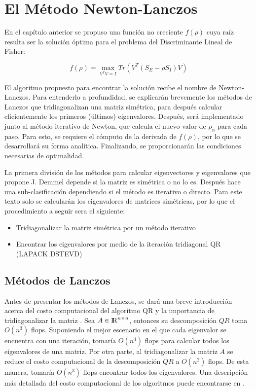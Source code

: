 \chapter{El Método Newton-Lanczos}
\label{ch:chapter3}

En el capítulo anterior se propuso una función no creciente $f(\rho)$ cuya raíz resulta ser la solución óptima para el problema del Discriminante Lineal de Fisher:

\begin{equation} \label{eq:3.1}
	f(\rho) = \max_{V^T V = I} Tr(V^T(S_E - \rho S_I)V)
\end{equation}

El algoritmo propuesto para encontrar la solución recibe el nombre de Newton-Lanczos\cite{ngo2012trace}. Para entenderlo a profundidad, se explicarán brevemente los métodos de Lanczos que tridiagonalizan una matriz simétrica, para después calcular eficientemente los primeros (últimos) eigenvalores. Después, será implementado junto al método iterativo de Newton, que calcula el nuevo valor de $\rho_{n}$ para cada paso. Para esto, se requiere el cómputo de la derivada de $f(\rho)$, por lo que se desarrollará su forma analítica. Finalizando, se proporcionarán las condiciones necesarias de optimalidad.

La primera división de los métodos para calcular eigenvectores y eigenvalores que propone J. Demmel \cite{demmel1997applied} depende si la matriz es simétrica o no lo es. Después hace una sub-clasificación dependiendo si el método es iterativo o directo. Para este texto solo se calcularán los eigenvalores de matrices simétricas, por lo que el procedimiento a seguir sera el siguiente:


\begin{itemize}
\item Tridiagonalizar la matriz simétrica por un método iterativo
\item Encontrar los eigenvalores por medio de la iteración tridiagonal QR (LAPACK DSTEVD)
\end{itemize}
\section{Métodos de Lanczos}
Antes de presentar los métodos de Lanczos, se dará una breve introducción acerca del costo computacional del algoritmo QR y la importancia de tridiagonalizar la matriz \cite{demmel1997applied}.  Sea $A \in {\rm I\!R}^{n \times n}$, entonces su descomposición $QR$ toma $O(n^3)$ flops. Suponiendo el mejor escenario en el que cada eigenvalor se encuentra con una iteración, tomaría $O(n^4)$ flops para calcular todos los eigenvalores de una matriz. Por otra parte, al tridiagonalizar la matriz $A$ se reduce el costo computacional de la descomposición $QR$ a $O(n^2)$ flops. De esta manera, tomaría $O(n^3)$ flops encontrar todos los eigenvalores. Una descripción más detallada del costo computacional de los algoritmos puede encontrarse en \cite{demmel1997applied}.


